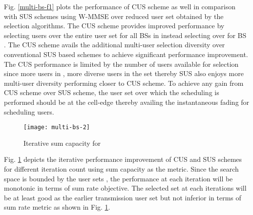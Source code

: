Fig. \ref{multi-bs-f1} plots the performance of CUS scheme as well in comparison with SUS schemes using W-MMSE over reduced user set obtained by the selection algorithms. The CUS scheme provides improved performance by selecting users over the entire user set  for all BSs in  instead selecting over  for BS . The CUS scheme avails the additional multi-user selection diversity over conventional SUS based schemes to achieve significant performance improvement. The CUS performance is limited by the number of users available for selection since more users in , more diverse users in the set thereby SUS also enjoys more multi-user diversity performing closer to CUS scheme. To achieve any gain from CUS scheme over SUS scheme, the user set  over which the scheduling is performed should be at the cell-edge thereby availing the instantaneous fading for scheduling users.
\begin{figure}
\centering
\texttt{[image: multi-bs-2]}
\caption[short]{Iterative sum capacity for }
\label{multi-bs-f2}
\end{figure}

Fig. \ref{multi-bs-f2} depicts the iterative performance improvement of CUS and SUS schemes for different iteration count using sum capacity as the metric. Since the search space is bounded by the user sets , the performance at each iteration will be monotonic in terms of sum rate objective. The selected set at each iterations will be at least good as the earlier transmission user set  but not inferior in terms of sum rate metric as shown in Fig. \ref{multi-bs-f2}.
